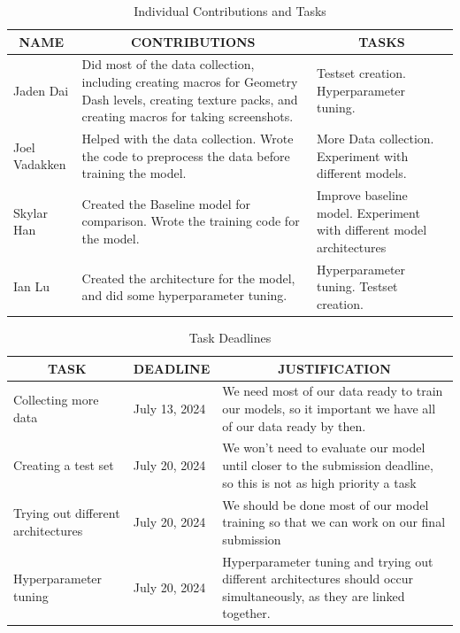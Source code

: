 \documentclass{article} %
\begin{document}
\begin{table}[h]
\caption{Individual Contributions and Tasks}
\label{table:contributions}
\begin{center}
\begin{tabular}{|p{2cm}|p{6cm}|p{6cm}|}
\hline
\multicolumn{1}{|c|}{\bf NAME} & \multicolumn{1}{c|}{\bf CONTRIBUTIONS} & \multicolumn{1}{c|}{\bf TASKS}\\ \hline
Jaden Dai & Did most of the data collection, including creating macros for Geometry Dash levels, creating texture packs, and creating macros for taking screenshots. & Testset creation. Hyperparameter tuning.\\ \hline
Joel Vadakken & Helped with the data collection. Wrote the code to preprocess the data before training the model. & More Data collection. Experiment with different models.\\ \hline
Skylar Han & Created the Baseline model for comparison. Wrote the training code for the model. & Improve baseline model. Experiment with different model architectures\\ \hline 
Ian Lu & Created the architecture for the model, and did some hyperparameter tuning. & Hyperparameter tuning. Testset creation. \\ \hline
\end{tabular}
\end{center}
\end{table}


\begin{table}[h]
\caption{Task Deadlines}
\label{table:task deadlines}
\begin{center}
\begin{tabular}{|p{3cm}|p{3cm}|p{6cm}|}
\hline
\multicolumn{1}{|c|}{\bf TASK} & \multicolumn{1}{c|}{\bf DEADLINE} & \multicolumn{1}{c|}{\bf JUSTIFICATION}\\ \hline
Collecting more data & July 13, 2024 & We need most of our data ready to train our models, so it important we have all of our data ready by then. \\ \hline 
Creating a test set & July 20, 2024 & We won't need to evaluate our model until closer to the submission deadline, so this is not as high priority a task \\ \hline 
Trying out different architectures & July 20, 2024 & We should be done most of our model training so that we can work on our final submission \\ \hline
Hyperparameter tuning & July 20, 2024 & Hyperparameter tuning and trying out different architectures should occur simultaneously, as they are linked together. \\ \hline
\end{tabular}
\end{center}
\end{table}
\end{document}
